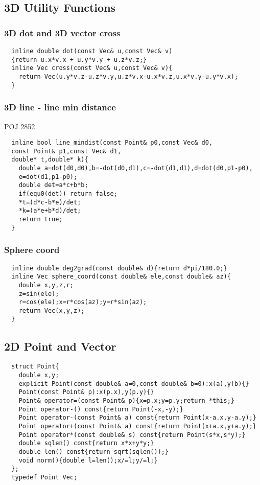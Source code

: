\documentclass[a4paper]{article}
\begin{document}
\subsection{3D Utility Functions}
\subsubsection{3D dot and 3D vector cross}
\begin{lstlisting}
  inline double dot(const Vec& u,const Vec& v) 
  {return u.x*v.x + u.y*v.y + u.z*v.z;}
  inline Vec cross(const Vec& u,const Vec& v){
    return Vec(u.y*v.z-u.z*v.y,u.z*v.x-u.x*v.z,u.x*v.y-u.y*v.x);
  }
\end{lstlisting}
\subsubsection{3D line - line min distance}
POJ 2852
\begin{lstlisting}
  inline bool line_mindist(const Point& p0,const Vec& d0,
  const Point& p1,const Vec& d1,
  double* t,double* k){
    double a=dot(d0,d0),b=-dot(d0,d1),c=-dot(d1,d1),d=dot(d0,p1-p0),
    e=dot(d1,p1-p0);
    double det=a*c+b*b;
    if(equ0(det)) return false;
    *t=(d*c-b*e)/det;
    *k=(a*e+b*d)/det;
    return true;
  }
\end{lstlisting}
\subsubsection{Sphere coord}
\begin{lstlisting}
  inline double deg2grad(const double& d){return d*pi/180.0;}
  inline Vec sphere_coord(const double& ele,const double& az){
    double x,y,z,r;
    z=sin(ele);
    r=cos(ele);x=r*cos(az);y=r*sin(az);
    return Vec(x,y,z);
  }
\end{lstlisting}
\subsection{2D Point and Vector}
\begin{lstlisting}
  struct Point{
    double x,y;
    explicit Point(const double& a=0,const double& b=0):x(a),y(b){}
    Point(const Point& p):x(p.x),y(p.y){}
    Point& operator=(const Point& p){x=p.x;y=p.y;return *this;}
    Point operator-() const{return Point(-x,-y);}
    Point operator-(const Point& a) const{return Point(x-a.x,y-a.y);}
    Point operator+(const Point& a) const{return Point(x+a.x,y+a.y);}
    Point operator*(const double& s) const{return Point(s*x,s*y);}
    double sqlen() const{return x*x+y*y;}
    double len() const{return sqrt(sqlen());}
    void norm(){double l=len();x/=l;y/=l;}
  };
  typedef Point Vec;
\end{lstlisting}
\end{document}
